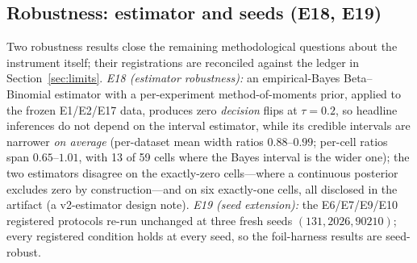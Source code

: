 \subsection{Robustness: estimator and seeds (E18, E19)}\label{sec:robust}

Two robustness results close the remaining methodological
questions about the instrument itself; their registrations are reconciled
against the ledger in Section~\ref{sec:limits}. \emph{E18 (estimator
robustness):} an
empirical-Bayes Beta--Binomial estimator with a per-experiment
method-of-moments prior, applied to the frozen E1/E2/E17 data, produces zero
\emph{decision} flips at $\tau=0.2$, so headline inferences do not depend on
the interval estimator, while its credible intervals are narrower
\emph{on average} (per-dataset mean width ratios $0.88$--$0.99$;
per-cell ratios span $0.65$--$1.01$, with 13 of 59 cells where the Bayes
interval is the wider one); the two estimators disagree on the exactly-zero
cells---where a continuous posterior excludes zero by construction---and on
six exactly-one cells, all disclosed in the artifact (a v2-estimator
design note).
\emph{E19 (seed extension):} the E6/E7/E9/E10 registered protocols re-run
unchanged at three fresh seeds $(131, 2026, 90210)$; every registered
condition holds at every seed, so the foil-harness results are seed-robust.
